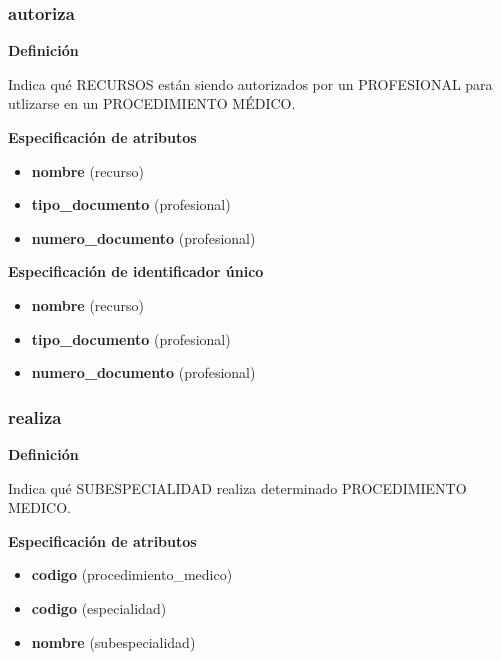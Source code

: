 \documentclass[a4paper,11pt]{article}
\begin{document}
\subsubsection{\textbf{autoriza}}

\textbf{Definición}

Indica qué RECURSOS están siendo autorizados por un PROFESIONAL para utlizarse en 
un PROCEDIMIENTO MÉDICO.

\textbf{Especificación de atributos}

\begin{itemize}

     \item \textbf{nombre} (recurso)

     \item \textbf{tipo\_documento} (profesional)

     \item \textbf{numero\_documento} (profesional)

\end{itemize}

\textbf{Especificación de identificador único}

\begin{itemize}

     \item \textbf{nombre} (recurso)

     \item \textbf{tipo\_documento} (profesional)

     \item \textbf{numero\_documento} (profesional)

\end{itemize}

\subsubsection{\textbf{realiza}}

\textbf{Definición}

Indica qué SUBESPECIALIDAD realiza determinado PROCEDIMIENTO MEDICO.

\textbf{Especificación de atributos}


\begin{itemize}
     \item \textbf{codigo} (procedimiento\_medico)

     \item \textbf{codigo} (especialidad)

     \item \textbf{nombre} (subespecialidad)


\end{itemize}
\end{document}
